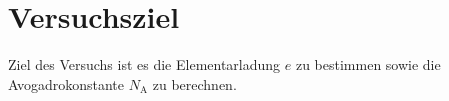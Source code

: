 \section{Versuchsziel}
\label{sec:Versuchsziel}

Ziel des Versuchs ist es die Elementarladung $e$ zu bestimmen sowie die Avogadrokonstante $N_\text{A}$ zu berechnen.